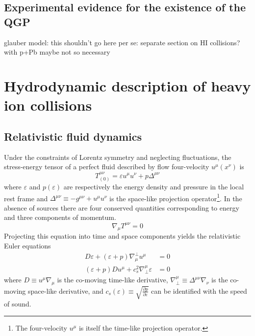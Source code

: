 
\subsection{Experimental evidence for the existence of the QGP}
glauber model: this shouldn't go here per se: \cite{Miller:2007ri} %
separate section on HI collisions? with p+Pb maybe not so necessary


\section{Hydrodynamic description of heavy ion collisions}

\subsection{Relativistic fluid dynamics}

Under the constraints of Lorentz symmetry and neglecting fluctuations, the stress-energy tensor of a perfect fluid described by flow four-velocity $u^\mu(x^\nu)$ is
\begin{equation}
T^{\mu\nu}_{(0)} = \varepsilon u^\mu u^\nu + p \Delta^{\mu\nu}
\end{equation}
where $\varepsilon$ and $p(\varepsilon)$ are respectively the energy density and pressure in the local rest frame and \( \Delta^{\mu\nu} \equiv -g^{\mu\nu} + u^\mu u^\nu \) is the space-like projection operator\footnote{The four-velocity $u^\mu$ is itself the time-like projection operator.}.
In the absence of sources there are four conserved quantities corresponding to energy and three components of momentum.
\begin{equation}
  \label{eq:em_cons}
  \nabla_\mu T^{\mu\nu} = 0
\end{equation}
Projecting this equation into time and space components yields the relativistic Euler equations
\begin{align}
  D\varepsilon + \left(\varepsilon + p\right)\nabla^\perp_\mu u^\mu &= 0 \\
  \left(\varepsilon + p\right)Du^\mu + c_s^2 \nabla_\perp^\mu \varepsilon &= 0 
\end{align}
where \(D \equiv u^\mu \nabla_\mu\) is the co-moving time-like derivative, \( \nabla_\perp^\mu \equiv \Delta^{\mu\nu} \nabla_\nu \) is the co-moving space-like derivative, and \(c_s(\varepsilon) \equiv \sqrt{\frac{\partial p}{\partial \varepsilon}} \) can be identified with the speed of sound.

